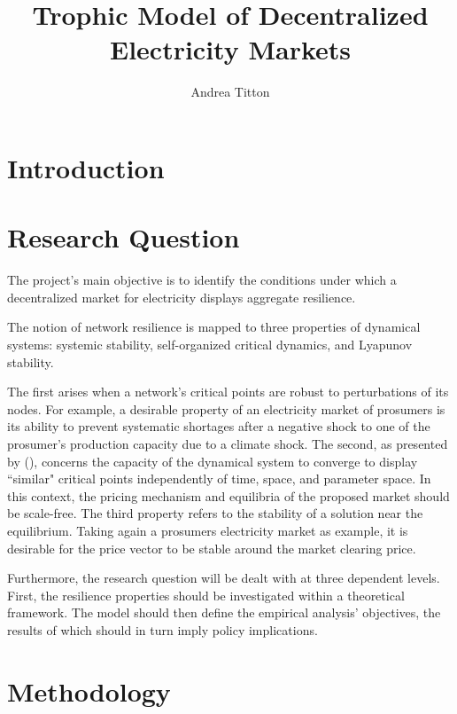 \documentclass[american]{scrartcl}
\title{
        Trophic Model of Decentralized Electricity Markets
    }
\author{Andrea Titton}
\begin{document}
\nocite{*}
\maketitle

\section{Introduction}

\section{Research Question}

The project's main objective is to identify the conditions under which a decentralized market for electricity displays aggregate resilience.

The notion of network resilience is mapped to three properties of dynamical systems: systemic stability, self-organized critical dynamics, and Lyapunov stability.

The first arises when a network's critical points are robust to perturbations of its nodes. For example, a desirable property of an electricity market of prosumers is its ability to prevent systematic shortages after a negative shock to one of the prosumer's production capacity due to a climate shock. The second, as presented by \citeauthor{Bak1995} (\citeyear{Bak1995}), concerns the capacity of the dynamical system to converge to display ``similar" critical points independently of time, space, and parameter space. In this context, the pricing mechanism and equilibria of the proposed market should be scale-free. The third property refers to the stability of a solution near the equilibrium. Taking again a prosumers electricity market as example, it is desirable for the price vector to be stable around the market clearing price.

Furthermore, the research question will be dealt with at three dependent levels. First, the resilience properties should be investigated within a theoretical framework. The model should then define the empirical analysis' objectives, the results of which should in turn imply policy implications.

\section{Methodology}

\newpage

\printbibliography
\end{document}
